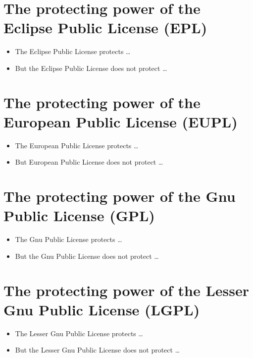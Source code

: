 \section{The protecting power of the Eclipse Public License (EPL)}
\begin{itemize} 
  \item The Eclipse Public License protects \ldots
  \item But the Eclipse Public License does not protect \ldots
\end{itemize}

\section{The protecting power of the European Public License (EUPL)}
\begin{itemize} 
  \item The European Public License protects \ldots
  \item But European Public License does not protect \ldots
\end{itemize}

\section{The protecting power of the Gnu Public License (GPL)}
\begin{itemize} 
  \item The Gnu Public License protects \ldots
  \item But the Gnu Public License does not protect \ldots
\end{itemize}

\section{The protecting power of the Lesser Gnu Public License (LGPL)}
\begin{itemize} 
  \item The Lesser Gnu Public License  protects \ldots
  \item But the Lesser Gnu Public License  does not protect \ldots
\end{itemize}

